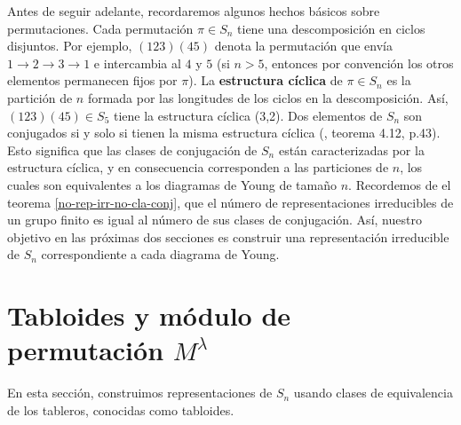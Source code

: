 \documentclass[12pt]{book}
\theoremstyle{definition}
\newcounter{in}
\newcounter{ini}
\begin{document}
Antes de seguir adelante, recordaremos algunos hechos básicos
sobre permutaciones. Cada permutación $\pi \in S_{n}$ tiene una
descomposición en ciclos disjuntos. Por ejemplo, $(123)(45)$ denota la
permutación que envía $1\rightarrow 2 \rightarrow 3 \rightarrow 1$  e
intercambia al $4$ y $5$ (si $n>5$, entonces por convención los otros
elementos permanecen fijos por $\pi$). La \textbf{estructura cíclica} de $\pi\in S_{n}$ es la
partición de $n$ formada por las longitudes de los ciclos en la
descomposición. Así, $(123)(45)\in S_{5}$ tiene la estructura
cíclica (3,2). Dos elementos de $S_{n}$ son conjugados si y solo si
tienen la misma estructura cíclica (\cite{zaldivar}, teorema 4.12, p.43). %
Esto significa que las clases de conjugación de $S_{n}$ están
caracterizadas por la estructura cíclica, y en consecuencia
corresponden a las particiones de $n$, los cuales son equivalentes a
los diagramas de Young de tamaño $n$. Recordemos de el teorema
\ref{no-rep-irr-no-cla-conj}, que el número de representaciones irreducibles de un
grupo finito es igual al número de sus clases de conjugación. Así,
nuestro objetivo en las próximas dos secciones es construir una
representación irreducible de $S_{n}$ correspondiente a cada diagrama
de Young.

\section{Tabloides y módulo de permutación $M^{\lambda}$}
\label{modulo-permutacion}

En esta sección, construimos representaciones de $S_{n}$ usando clases
de equivalencia de los tableros, conocidas como tabloides.
\end{document}

